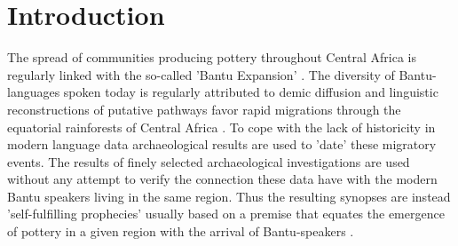 \documentclass[smallextended,natbib]{svjour3}       %
\begin{document}

\section{Introduction}\label{intro}

The spread of communities producing pottery throughout Central Africa is regularly linked with the so-called 'Bantu Expansion' \citep{Bostoen.2018,Bostoen.2020}. The diversity of Bantu-languages spoken today is regularly attributed to demic diffusion \citep{Pakendorf.2011,Bostoen.2022} and linguistic reconstructions of putative pathways favor rapid migrations through the equatorial rainforests of Central Africa \citep{Grollemund.2015,Bostoen.2015,Koile.2022}. To cope with the lack of historicity in modern language data archaeological results are used to 'date' these migratory events. The results of finely selected archaeological investigations are used without any attempt to verify the connection these data have with the modern Bantu speakers living in the same region. Thus the resulting synopses are instead 'self-fulfilling prophecies' usually based on a premise that equates the emergence of pottery in a given region with the arrival of Bantu-speakers \citep[355,362,364]{Bostoen.2015}.
\end{document}
